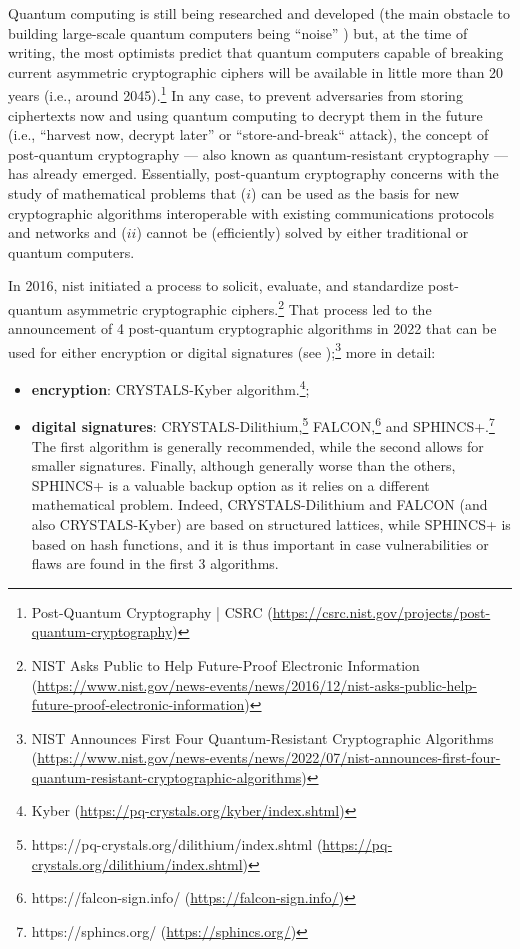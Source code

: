 Quantum computing is still being researched and developed (the main obstacle to building large-scale quantum computers being ``noise'' \cite{fosel_reinforcement_2018}) but, at the time of writing, the most optimists predict that quantum computers capable of breaking current asymmetric cryptographic ciphers will be available in little more than 20 years (i.e., around 2045).\footnote{Post-Quantum Cryptography | CSRC (\url{https://csrc.nist.gov/projects/post-quantum-cryptography})} In any case, to prevent adversaries from storing ciphertexts now and using quantum computing to decrypt them in the future (i.e., ``harvest now, decrypt later'' or ``store-and-break`` attack), the concept of post-quantum cryptography --- also known as quantum-resistant cryptography --- has already emerged. Essentially, post-quantum cryptography concerns with the study of mathematical problems that ($i$) can be used as the basis for new cryptographic algorithms interoperable with existing communications protocols and networks and ($ii$) cannot be (efficiently) solved by either traditional or quantum computers.

In 2016, \gls{nist} initiated a process to solicit, evaluate, and standardize post-quantum asymmetric cryptographic ciphers.\footnote{NIST Asks Public to Help Future-Proof Electronic Information (\url{https://www.nist.gov/news-events/news/2016/12/nist-asks-public-help-future-proof-electronic-information})} That process led to the announcement of 4 post-quantum cryptographic algorithms in 2022 that can be used for either encryption or digital signatures (see );\footnote{NIST Announces First Four Quantum-Resistant Cryptographic Algorithms (\url{https://www.nist.gov/news-events/news/2022/07/nist-announces-first-four-quantum-resistant-cryptographic-algorithms})} more in detail:

\begin{itemize}
	\item \textbf{encryption}: CRYSTALS-Kyber algorithm.\footnote{Kyber (\url{https://pq-crystals.org/kyber/index.shtml})};
	\item \textbf{digital signatures}: CRYSTALS-Dilithium,\footnote{https://pq-crystals.org/dilithium/index.shtml (\url{https://pq-crystals.org/dilithium/index.shtml})}
	FALCON,\footnote{https://falcon-sign.info/ (\url{https://falcon-sign.info/})}
	and SPHINCS+.\footnote{https://sphincs.org/ (\url{https://sphincs.org/})} The first algorithm is generally recommended, while the second allows for smaller signatures. Finally, although generally worse than the others, SPHINCS+ is a valuable backup option as it relies on a different mathematical problem. Indeed, CRYSTALS-Dilithium and FALCON (and also CRYSTALS-Kyber) are based on structured lattices, while SPHINCS+ is based on hash functions, and it is thus important in case vulnerabilities or flaws are found in the first 3 algorithms.
\end{itemize}

